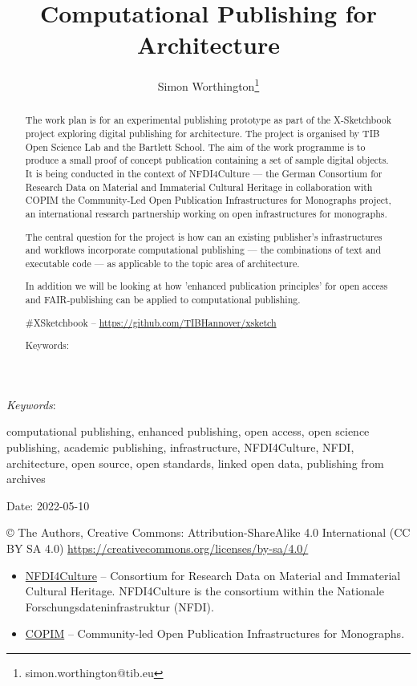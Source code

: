 \documentclass{article}
\author{Simon Worthington\thanks{simon.worthington@tib.eu}}
\affil{NextGen Books – making the future book, TIB }
\newcommand{\subtitle}[1]{%
                    
	\posttitle{%
                        
		\par\end{center}
                        
		\begin{center}\large#1\end{center}
                        
		\vskip 0.5em}%
                }
\def\keywords{\vspace{.5em}
                
{\textit{Keywords}:\,\relax%
                
}}
\newcommand{\sep}{, }
\begin{document}
\title{Computational Publishing for Architecture}
\subtitle{An X-Sketchbook Research Work Plan}

\maketitle

\begin{abstract}


The work plan is for an experimental publishing prototype as part of the X-Sketchbook project exploring digital publishing for architecture. The project is organised by TIB Open Science Lab and the Bartlett School. The aim of the work programme is to produce a small proof of concept publication containing a set of sample digital objects. It is being conducted in the context of NFDI4Culture — the German Consortium for Research Data on Material and Immaterial Cultural Heritage in collaboration with COPIM the Community-Led Open Publication Infrastructures for Monographs project, an international research partnership working on open infrastructures for monographs.


The central question for the project is how can an existing publisher's infrastructures and workflows incorporate computational publishing — the combinations of text and executable code — as applicable to the topic area of architecture. 


In addition we will be looking at how 'enhanced publication principles' for open access and FAIR‑publishing can be applied to  computational publishing. 


\#XSketchbook – \href{https://github.com/TIBHannover/xsketch}{https://github.com/TIBHannover/xsketch}


Keywords:

\end{abstract}

\keywords{computational publishing\sep enhanced publishing\sep open access\sep open science publishing\sep academic publishing\sep infrastructure\sep NFDI4Culture\sep NFDI\sep architecture\sep open source\sep open standards\sep linked open data\sep publishing from archives}

Date: 2022-05-10 


© The Authors, Creative Commons: Attribution-ShareAlike 4.0 International (CC BY SA 4.0) \href{https://creativecommons.org/licenses/by-sa/4.0/}{https://creativecommons.org/licenses/by-sa/4.0/} 

\begin{itemize}
\item \href{https://nfdi4culture.de/}{NFDI4Culture} – Consortium for Research Data on Material and Immaterial Cultural Heritage. NFDI4Culture is the consortium within the Nationale Forschungsdaten­infrastruktur (NFDI).


\item \href{https://www.copim.ac.uk/}{COPIM} – Community-led Open Publication Infrastructures for Monographs.


\end{itemize}
\end{document}
